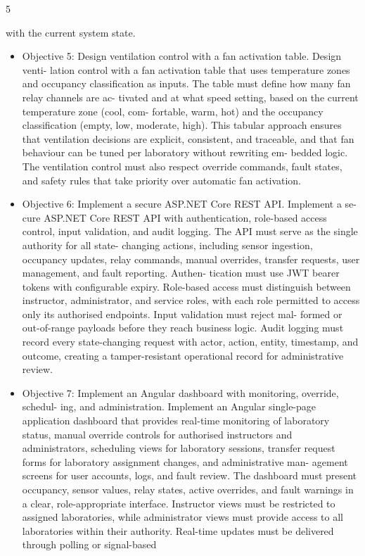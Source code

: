5


with the current system state.

\begin{itemize}
  \item Objective 5: Design ventilation control with a fan activation table. Design venti-
lation control with a fan activation table that uses temperature zones and occupancy
classiﬁcation as inputs. The table must deﬁne how many fan relay channels are ac-
tivated and at what speed setting, based on the current temperature zone (cool, com-
fortable, warm, hot) and the occupancy classiﬁcation (empty, low, moderate, high).
This tabular approach ensures that ventilation decisions are explicit, consistent, and
traceable, and that fan behaviour can be tuned per laboratory without rewriting em-
bedded logic. The ventilation control must also respect override commands, fault
states, and safety rules that take priority over automatic fan activation.
\end{itemize}

\begin{itemize}
  \item Objective 6: Implement a secure ASP.NET Core REST API. Implement a se-
cure ASP.NET Core REST API with authentication, role-based access control, input
validation, and audit logging. The API must serve as the single authority for all state-
changing actions, including sensor ingestion, occupancy updates, relay commands,
manual overrides, transfer requests, user management, and fault reporting. Authen-
tication must use JWT bearer tokens with conﬁgurable expiry. Role-based access
must distinguish between instructor, administrator, and service roles, with each role
permitted to access only its authorised endpoints. Input validation must reject mal-
formed or out-of-range payloads before they reach business logic. Audit logging
must record every state-changing request with actor, action, entity, timestamp, and
outcome, creating a tamper-resistant operational record for administrative review.
\end{itemize}

\begin{itemize}
  \item Objective 7: Implement an Angular dashboard with monitoring, override, schedul-
ing, and administration. Implement an Angular single-page application dashboard
that provides real-time monitoring of laboratory status, manual override controls for
authorised instructors and administrators, scheduling views for laboratory sessions,
transfer request forms for laboratory assignment changes, and administrative man-
agement screens for user accounts, logs, and fault review. The dashboard must
present occupancy, sensor values, relay states, active overrides, and fault warnings
in a clear, role-appropriate interface. Instructor views must be restricted to assigned
laboratories, while administrator views must provide access to all laboratories within
their authority. Real-time updates must be delivered through polling or signal-based
\end{itemize}

